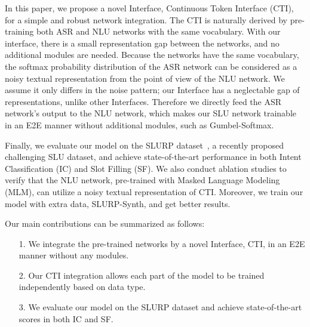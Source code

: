 \documentclass{article}
\newcommand{\interface}{CTI}
\begin{document}
In this paper, we propose a novel Interface, Continuous Token Interface (\interface), for a simple and robust network integration.
The CTI is naturally derived by pre-training both ASR and NLU networks with the same vocabulary.
With our interface, there is a small representation gap between the networks, and no additional modules are needed.
Because the networks have the same vocabulary, the softmax probability distribution of the ASR network can be considered as a noisy textual representation from the point of view of the NLU network.
We assume it only differs in the noise pattern; our Interface has a neglectable gap of representations, unlike other Interfaces.
Therefore we directly feed the ASR network's output to the NLU network, which makes our SLU network trainable in an E2E manner without additional modules, such as Gumbel-Softmax.

Finally, we evaluate our model on the SLURP dataset~\cite{bastianelli2020slurp}, a recently proposed challenging SLU dataset, and achieve state-of-the-art performance in both Intent Classification (IC) and Slot Filling (SF). 
We also conduct ablation studies to verify that the NLU network, pre-trained with Masked Language Modeling (MLM), can utilize a noisy textual representation of \interface.
Moreover, we train our model with extra data, SLURP-Synth, and get better results.









Our main contributions can be summarized as follows:
\vspace{-2mm}
\begin{itemize}
    \item[1.]{We integrate the pre-trained networks by a novel Interface, CTI, in an E2E manner without any modules.}
    \vspace{-3mm}
\item[2.]{Our CTI integration allows each part of the model to be trained independently based on data type.}
    \vspace{-3mm}
    \item[3.]{We evaluate our model on the SLURP dataset and achieve state-of-the-art scores in both IC and SF.}


\end{itemize}
\end{document}
